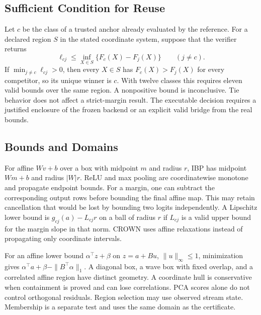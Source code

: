 \documentclass[journal]{IEEEtran}
\begin{document}
\subsection{Sufficient Condition for Reuse}
Let $c$ be the class of a trusted anchor already evaluated by the reference. For a declared region $S$ in the stated coordinate system, suppose that the verifier returns
\[
 \ell_{cj}\le \inf_{X\in S}\{F_c(X)-F_j(X)\}
 \qquad (j\ne c).
\]
If $\min_{j\ne c}\ell_{cj}>0$, then every $X\in S$ has $F_c(X)>F_j(X)$ for every competitor, so its unique winner is $c$. With twelve classes this requires eleven valid bounds over the same region. A nonpositive bound is inconclusive. Tie behavior does not affect a strict-margin result. The executable decision requires a justified enclosure of the frozen backend or an explicit valid bridge from the real bounds.
\subsection{Bounds and Domains}
For affine $Wv+b$ over a box with midpoint $m$ and radius $r$, IBP has midpoint $Wm+b$ and radius $|W|r$. ReLU and max pooling are coordinatewise monotone and propagate endpoint bounds. For a margin, one can subtract the corresponding output rows before bounding the final affine map. This may retain cancellation that would be lost by bounding two logits independently. A Lipschitz lower bound is $g_{cj}(a)-L_{cj}r$ on a ball of radius $r$ if $L_{cj}$ is a valid upper bound for the margin slope in that norm. CROWN uses affine relaxations instead of propagating only coordinate intervals.
\par
For an affine lower bound $\alpha^\top z+\beta$ on $z=a+Bu$, $\|u\|_\infty\le1$, minimization gives $\alpha^\top a+\beta-\|B^\top\alpha\|_1$. A diagonal box, a wave box with fixed overlap, and a correlated affine region have distinct geometry. A coordinate hull is conservative when containment is proved and can lose correlations. PCA scores alone do not control orthogonal residuals. Region selection may use observed stream state. Membership is a separate test and uses the same domain as the certificate.
\end{document}
